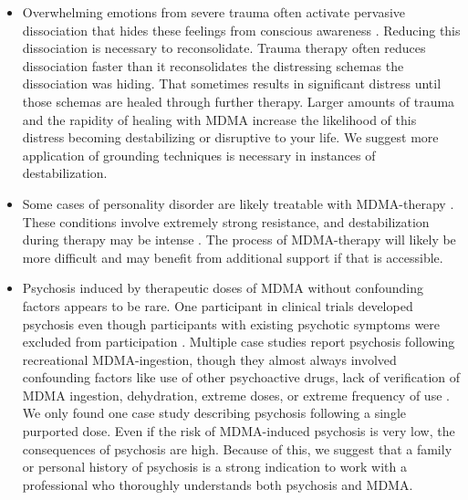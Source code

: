 \documentclass[12pt,letterpaper]{article}
\begin{document}
\begin{itemize}
    \item Overwhelming emotions from severe trauma often activate pervasive dissociation that hides these feelings from conscious awareness \cite{razviPSIP}. Reducing this dissociation is necessary to reconsolidate. Trauma therapy often reduces dissociation faster than it reconsolidates the distressing schemas the dissociation was hiding. That sometimes results in significant distress until those schemas are healed through further therapy. Larger amounts of trauma and the rapidity of healing with MDMA increase the likelihood of this distress becoming destabilizing or disruptive to your life. We suggest more application of grounding techniques is necessary in instances of destabilization.   
    \item Some cases of personality disorder are likely treatable with MDMA-therapy \cite{traynorBorderline}. These conditions involve extremely strong resistance, and destabilization during therapy may be intense \cite{razviPSIP}. The process of MDMA-therapy will likely be more difficult and may benefit from additional support if that is accessible.
    \item Psychosis induced by therapeutic doses of MDMA without confounding factors appears to be rare. One participant in clinical trials developed psychosis even though participants with existing psychotic symptoms were excluded from participation \cite{studyingHarms,smithSystematic,mitchellMDMAClinicalTrial2}. Multiple case studies report psychosis following recreational MDMA-ingestion, though they almost always involved confounding factors like use of other psychoactive drugs, lack of verification of MDMA ingestion, dehydration, extreme doses, or extreme frequency of use \cite{mcguirePsychosis,patelPsychosis,vaivaPsychosis}. We only found one case study describing psychosis following a single purported dose. Even if the risk of MDMA-induced psychosis is very low, the consequences of psychosis are high. Because of this, we suggest that a family or personal history of psychosis is a strong indication to work with a professional who thoroughly understands both psychosis and MDMA.

\end{itemize}
\end{document}
